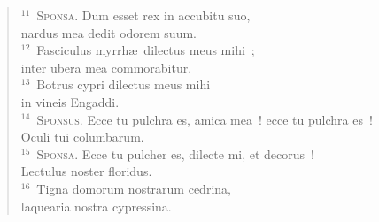 \begin{verse}
${}^{11}$~\textsc{Sponsa.} Dum esset rex in accubitu suo,\\ nardus mea dedit odorem suum.\\
${}^{12}$~Fasciculus myrrh\ae\ dilectus meus mihi~;\\ inter ubera mea commorabitur.\\
${}^{13}$~Botrus cypri dilectus meus mihi\\ in vineis Engaddi.\\
${}^{14}$~\textsc{Sponsus.} Ecce tu pulchra es, amica mea~! ecce tu pulchra es~!\\ Oculi tui columbarum.\\
${}^{15}$~\textsc{Sponsa.} Ecce tu pulcher es, dilecte mi, et decorus~!\\ Lectulus noster floridus.\\
${}^{16}$~Tigna domorum nostrarum cedrina,\\ laquearia nostra cypressina.\end{verse}



